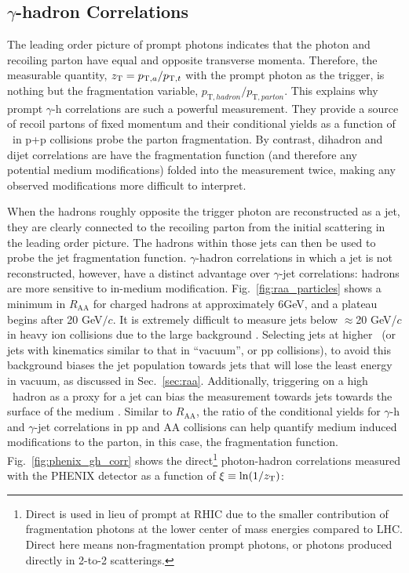 \subsection{$\gamma$-hadron Correlations}
\label{sec:intro_gh}
The leading order picture of prompt photons indicates that the photon and recoiling parton have equal and opposite transverse momenta. Therefore, the measurable quantity, $z_{\mathrm{T}} = p_{\mathrm{T},a}/p_{\mathrm{T},t}$ with the prompt photon as the trigger, is nothing but the fragmentation variable, $p_{\mathrm{T},hadron}/p_{\mathrm{T},parton}$. This explains why prompt $\gamma$-h correlations are such a powerful measurement. They provide a source of recoil partons of fixed momentum and their conditional yields as a function of \zt~in p+p collisions probe the parton fragmentation. By contrast, dihadron and dijet correlations are have the fragmentation function (and therefore any potential medium modifications) folded into the measurement twice, making any observed modifications more difficult to interpret.

When the hadrons roughly opposite the trigger photon are reconstructed as a jet, they are clearly connected to the recoiling parton from the initial scattering in the leading order picture. The hadrons within those jets can then be used to probe the jet fragmentation function. $\gamma$-hadron correlations in which a jet is not reconstructed, however, have a distinct advantage over $\gamma$-jet correlations: hadrons are more sensitive to in-medium modification. Fig.~\ref{fig:raa_particles} shows a minimum in $R_\mathrm{AA}$ for charged hadrons at approximately 6GeV, and a plateau begins after 20 GeV$/c$. It is extremely difficult to measure jets below  $\approx$20 GeV/$c$ in heavy ion collisions due to the large background \cite{STARCollaboration2017}. Selecting jets at higher \pt~(or jets with kinematics similar to that in ``vacuum'', or pp collisions), to avoid this background biases the jet population towards jets that will lose the least energy in vacuum, as discussed in Sec.~\ref{sec:raa}. Additionally, triggering on a high \pt~hadron as a proxy for a jet can bias the measurement towards jets towards the surface of the medium \cite{Zhang2007}. Similar to $R_\mathrm{AA}$, the ratio of the conditional yields for $\gamma$-h and $\gamma$-jet correlations in pp and AA collisions can help quantify medium induced modifications to the parton, in this case, the fragmentation function. Fig.~\ref{fig:phenix_gh_corr} shows the direct\footnote{Direct is used in lieu of prompt at RHIC due to the smaller contribution of fragmentation photons at the lower center of mass energies compared to LHC. Direct here means non-fragmentation prompt photons, or photons produced directly in 2-to-2 scatterings.} photon-hadron correlations measured with the PHENIX detector as a function of $\xi\equiv\ln(1/z_{\mathrm{T}})$:

